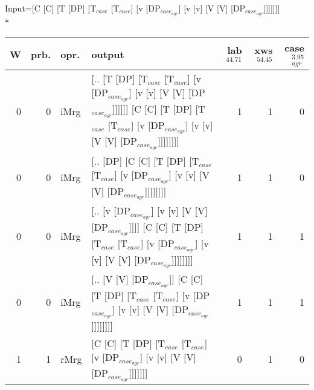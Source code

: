 \begingroup\scriptsize Input=[C [C] [T [DP] [T$_{case}$ [T$_{case}$] [v [DP$_{case_{agr}}$] [v [v] [V [V] [DP$_{case_{agr}}$]]]]]]]\\*
\begin{tabularx}{\linewidth}{rrlXrrr}
\hline
   W &   prb. & opr.   & output                                                                                                                                                             &   lab$^{44.71}$ &   xws$^{54.45}$ &   case$_{agr}^{3.95}$ \\
\hline
   0 &   0 & iMrg & [.. [T [DP] [T$_{case}$ [T$_{case}$] [v [DP$_{case_{agr}}$] [v [v] [V [V] [DP$_{case_{agr}}$]]]]]] [C [C] [T [DP] [T$_{case}$ [T$_{case}$] [v [DP$_{case_{agr}}$] [v [v] [V [V] [DP$_{case_{agr}}$]]]]]]]] &             1 &             1 &                  0 \\
   0 &   0 & iMrg & [.. [DP] [C [C] [T [DP] [T$_{case}$ [T$_{case}$] [v [DP$_{case_{agr}}$] [v [v] [V [V] [DP$_{case_{agr}}$]]]]]]]]                                                                       &             1 &             1 &                  0 \\
   0 &   0 & iMrg & [.. [v [DP$_{case_{agr}}$] [v [v] [V [V] [DP$_{case_{agr}}$]]]] [C [C] [T [DP] [T$_{case}$ [T$_{case}$] [v [DP$_{case_{agr}}$] [v [v] [V [V] [DP$_{case_{agr}}$]]]]]]]]                            &             1 &             1 &                  1 \\
   0 &   0 & iMrg & [.. [V [V] [DP$_{case_{agr}}$]] [C [C] [T [DP] [T$_{case}$ [T$_{case}$] [v [DP$_{case_{agr}}$] [v [v] [V [V] [DP$_{case_{agr}}$]]]]]]]]                                                      &             1 &             1 &                  1 \\
   1 &   1 & rMrg & [C [C] [T [DP] [T$_{case}$ [T$_{case}$] [v [DP$_{case_{agr}}$] [v [v] [V [V] [DP$_{case_{agr}}$]]]]]]]                                                                                 &             0 &             1 &                  0 \\
\hline
\end{tabularx}\endgroup\\
